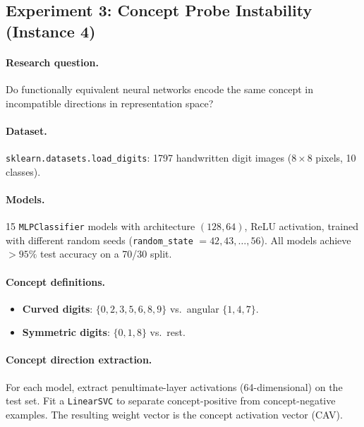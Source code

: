 \documentclass[11pt,a4paper]{article}
\begin{document}
\subsection{Experiment 3: Concept Probe Instability (Instance 4)}
\label{app:exp-concept}

\paragraph{Research question.}
Do functionally equivalent neural networks encode the same concept in
incompatible directions in representation space?

\paragraph{Dataset.}
\texttt{sklearn.datasets.load\_digits}: 1797 handwritten digit images
($8 \times 8$ pixels, 10 classes).

\paragraph{Models.}
15 \texttt{MLPClassifier} models with architecture $(128, 64)$, ReLU
activation, trained with different random seeds (\texttt{random\_state}
$= 42, 43, \ldots, 56$).  All models achieve $>95\%$ test accuracy on
a 70/30 split.

\paragraph{Concept definitions.}
\begin{itemize}[nosep]
  \item \textbf{Curved digits}: $\{0, 2, 3, 5, 6, 8, 9\}$ vs.\ angular
    $\{1, 4, 7\}$.
  \item \textbf{Symmetric digits}: $\{0, 1, 8\}$ vs.\ rest.
\end{itemize}

\paragraph{Concept direction extraction.}
For each model, extract penultimate-layer activations (64-dimensional) on
the test set.  Fit a \texttt{LinearSVC} to separate concept-positive from
concept-negative examples.  The resulting weight vector is the concept
activation vector (CAV).
\end{document}
